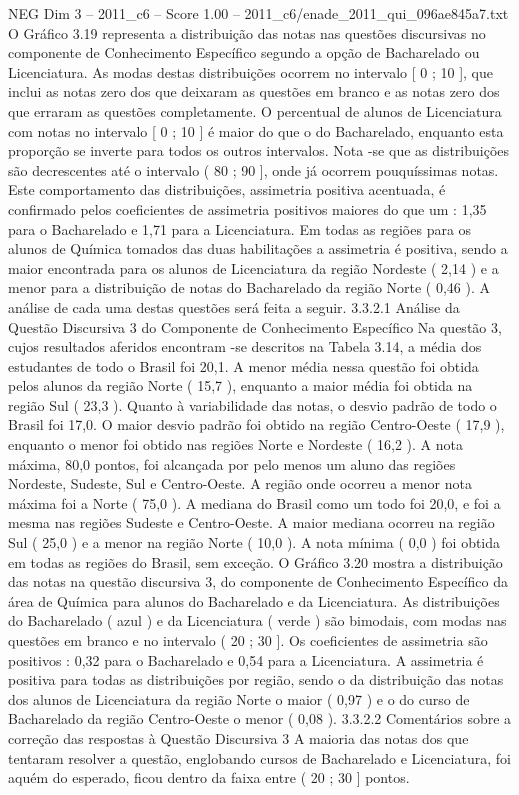 \begin{textsample}{NEG Dim 3 – 2011\_c6 – Score 1.00 – 2011\_c6/enade\_2011\_qui\_096ae845a7.txt}
O Gráfico 3.19 representa a distribuição das notas nas questões discursivas no componente de Conhecimento Específico segundo a opção de Bacharelado ou Licenciatura.
As modas destas distribuições ocorrem no intervalo [ 0 ; 10 ], que inclui as notas zero dos que deixaram as questões em branco e as notas zero dos que erraram as questões completamente.
O percentual de alunos de Licenciatura com notas no intervalo [ 0 ; 10 ] é maior do que o do Bacharelado, enquanto esta proporção se inverte para todos os outros intervalos.
Nota -se que as distribuições são decrescentes até o intervalo ( 80 ; 90 ], onde já ocorrem pouquíssimas notas.
Este comportamento das distribuições, assimetria positiva acentuada, é confirmado pelos coeficientes de assimetria positivos maiores do que um : 1,35 para o Bacharelado e 1,71 para a Licenciatura.
Em todas as regiões para os alunos de Química tomados das duas habilitações a assimetria é positiva, sendo a maior encontrada para os alunos de Licenciatura da região Nordeste ( 2,14 ) e a menor para a distribuição de notas do Bacharelado da região Norte ( 0,46 ).
A análise de cada uma destas questões será feita a seguir. 3.3.2.1 Análise da Questão Discursiva 3 do Componente de Conhecimento Específico Na questão 3, cujos resultados aferidos encontram -se descritos na Tabela 3.14, a média dos estudantes de todo o Brasil foi 20,1.
A menor média nessa questão foi obtida pelos alunos da região Norte ( 15,7 ), enquanto a maior média foi obtida na região Sul ( 23,3 ).
Quanto à variabilidade das notas, o desvio padrão de todo o Brasil foi 17,0.
O maior desvio padrão foi obtido na região Centro-Oeste ( 17,9 ), enquanto o menor foi obtido nas regiões Norte e Nordeste ( 16,2 ).
A nota máxima, 80,0 pontos, foi alcançada por pelo menos um aluno das regiões Nordeste, Sudeste, Sul e Centro-Oeste.
A região onde ocorreu a menor nota máxima foi a Norte ( 75,0 ).
A mediana do Brasil como um todo foi 20,0, e foi a mesma nas regiões Sudeste e Centro-Oeste.
A maior mediana ocorreu na região Sul ( 25,0 ) e a menor na região Norte ( 10,0 ).
A nota mínima ( 0,0 ) foi obtida em todas as regiões do Brasil, sem exceção.
O Gráfico 3.20 mostra a distribuição das notas na questão discursiva 3, do componente de Conhecimento Específico da área de Química para alunos do Bacharelado e da Licenciatura.
As distribuições do Bacharelado ( azul ) e da Licenciatura ( verde ) são bimodais, com modas nas questões em branco e no intervalo ( 20 ; 30 ].
Os coeficientes de assimetria são positivos : 0,32 para o Bacharelado e 0,54 para a Licenciatura.
A assimetria é positiva para todas as distribuições por região, sendo o da distribuição das notas dos alunos de Licenciatura da região Norte o maior ( 0,97 ) e o do curso de Bacharelado da região Centro-Oeste o menor ( 0,08 ). 3.3.2.2 Comentários sobre a correção das respostas à Questão Discursiva 3 A maioria das notas dos que tentaram resolver a questão, englobando cursos de Bacharelado e Licenciatura, foi aquém do esperado, ficou dentro da faixa entre ( 20 ; 30 ] pontos.

\end{textsample}
